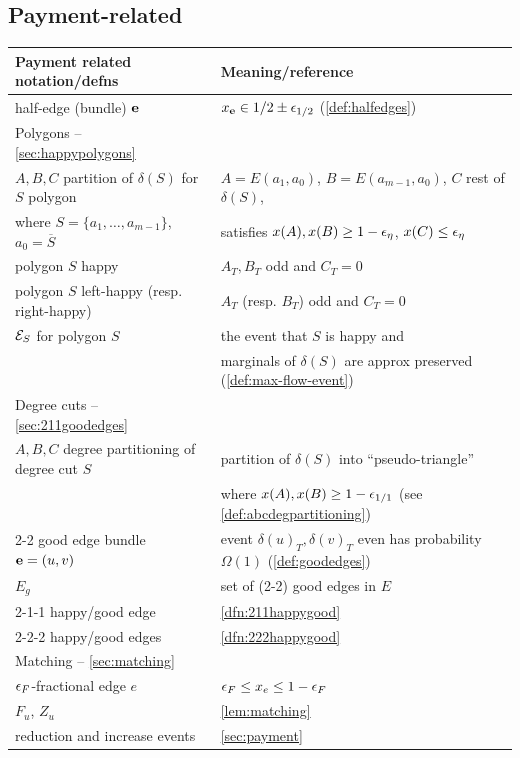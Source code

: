 {\subsection*{Payment-related}
\noindent
 \begin{tabular}{|l |l |} 
 \hline
Payment related notation/defns & Meaning/reference \\ 
 \hline\hline
half-edge (bundle) ${\bf e}$  &  $x_{\bf e} \in 1/2 \pm {\epsilon}_{1/2}$ (\cref{def:halfedges})\\
\hline
Polygons -- \cref{sec:happypolygons} & \\
$A,B,C$ partition of $\delta(S)$ for $S$ polygon 
&   $A= E(a_1, a_0)$, $B = E(a_{m-1}, a_0)$, $C$ rest of $\delta(S)$,\\
\quad\quad where $S = \{a_1, \ldots , a_{m-1}\}$, $a_0 = \overline S$ & satisfies $x(A), x(B) \ge 1- {\epsilon}_\eta$, $x(C) \le {\epsilon}_\eta$\\
polygon $S$ happy & $A_T, B_T$ odd and $C_T = 0$\\
polygon $S$ left-happy (resp. right-happy) & $A_T$ (resp. $B_T$) odd and $C_T = 0$\\
${\cal E}_S$ for polygon $S$ & the event that $S$ is happy and\\
& \quad\quad marginals of $\delta(S)$ are approx preserved (\cref{def:max-flow-event})\\
\hline
Degree cuts -- \cref{sec:211goodedges} 
& \\
$A,B,C$ degree partitioning of degree cut $S$ & partition of  $\delta(S)$ into ``pseudo-triangle'' \\
&\quad\quad
where $x(A), x(B) \ge 1- {\epsilon}_{1/1}$ (see \cref{def:abcdegpartitioning})\\
2-2 good edge bundle ${\bf e} = (u,v)$ &  event $\delta(u)_T, \delta(v)_T$ even
has probability $\Omega (1)$ (\cref{def:goodedges})\\
$E_g$ & set of (2-2) good edges in $E$ \\
2-1-1 happy/good edge & \cref{dfn:211happygood}\\
2-2-2 happy/good edges & \cref{dfn:222happygood}\\
 \hline
 Matching -- \cref{sec:matching} &\\
 ${\epsilon}_F$-fractional edge $e$ & ${\epsilon}_F \le x_e \le 1- {\epsilon}_F$\\
 $F_u$, $Z_u$ & \cref{lem:matching} \\
 \hline
 reduction and increase events & \cref{sec:payment} \\
 \hline
\end{tabular}


}

